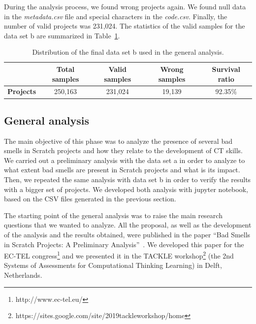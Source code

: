 During the analysis process, we found wrong projects again. We found null data in the \textit{metadata.csv} file and special characters in the \textit{code.csv}. Finally, the number of valid projects was 231,024. The statistics of the valid samples for the data set b are summarized in Table~\ref{table:datacollection_b}.

\begin{table}
 \begin{center}
  \begin{tabular}{|c|c|c|c|c|}
    \hline
     & \textbf{Total samples} & \textbf{Valid samples} & \textbf{Wrong samples} & \textbf{Survival ratio} \\ \hline
    \textbf{Projects} & 250,163 & 231,024 & 19,139 & 92.35\% \\ \hline
  \end{tabular}
  \caption{Distribution of the final data set b used in the general analysis.}
  \label{table:datacollection_b}
 \end{center}
\end{table}
    

\subsection{General analysis}
\label{subsec:generalanalysis}

The main objective of this phase was to analyze the presence of several bad smells in Scratch projects and how they relate to the development of CT skills. We carried out a preliminary analysis with the data set a in order to analyze to what extent bad smells are present in Scratch projects and what is its impact. Then, we repeated the same analysis with data set b in order to verify the results with a bigger set of projects. We developed both analysis with jupyter notebook, based on the CSV files generated in the previous section. 

The starting point of the general analysis was to raise the main research questions that we wanted to analyze. All the proposal, as well as the development of the analysis and the results obtained, were published in the paper ``Bad Smells in Scratch Projects: A Preliminary Analysis''~\cite{vargas2019bad}. We developed this paper for the EC-TEL congress\footnote{http://www.ec-tel.eu/} and we presented it in the TACKLE workshop\footnote{https://sites.google.com/site/2019tackleworkshop/home} (the 2nd Systems of Assessments for Computational Thinking Learning) in Delft, Netherlands.

